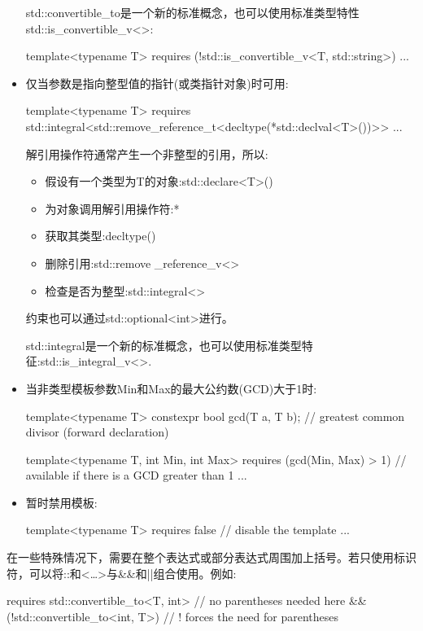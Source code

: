 \begin{itemize}
std::convertible\_to是一个新的标准概念，也可以使用标准类型特性std::is\_convertible\_v<>:

\begin{cpp}
template<typename T>
requires (!std::is_convertible_v<T, std::string>)
...
\end{cpp}

\item
仅当参数是指向整型值的指针(或类指针对象)时可用:

\begin{cpp}
template<typename T>
requires std::integral<std::remove_reference_t<decltype(*std::declval<T>())>>
...
\end{cpp}

解引用操作符通常产生一个非整型的引用，所以:

\begin{itemize}
\item
假设有一个类型为T的对象:std::declare<T>()

\item
为对象调用解引用操作符:*

\item
获取其类型:decltype()

\item
删除引用:std::remove \_reference\_v<>

\item
检查是否为整型:std::integral<>
\end{itemize}

约束也可以通过std::optional<int>进行。

std::integral是一个新的标准概念，也可以使用标准类型特征:std::is\_integral\_v<>.

\item
当非类型模板参数Min和Max的最大公约数(GCD)大于1时:

\begin{cpp}
template<typename T>
constexpr bool gcd(T a, T b); // greatest common divisor (forward declaration)

template<typename T, int Min, int Max>
requires (gcd(Min, Max) > 1) // available if there is a GCD greater than 1
...
\end{cpp}

\item
暂时禁用模板:

\begin{cpp}
template<typename T>
requires false // disable the template
...
\end{cpp}
\end{itemize}

在一些特殊情况下，需要在整个表达式或部分表达式周围加上括号。若只使用标识符，可以将::和<…>与\&\&和||组合使用。例如:

\begin{cpp}
requires std::convertible_to<T, int> // no parentheses needed here
		&&
		(!std::convertible_to<int, T>) // ! forces the need for parentheses
\end{cpp}


























